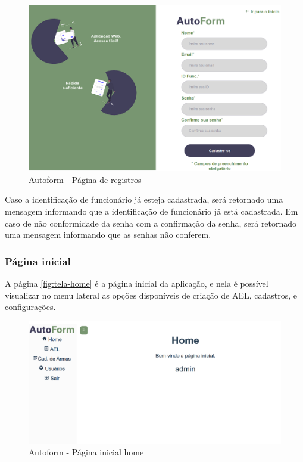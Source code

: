 \begin{figure}[htb]
    \caption{\label{fig:tela-registro}Autoform - Página de registros}
    \begin{center}
        \includegraphics[scale=0.6]{imagens/registro-autoform.png}   
     \end{center}
\end{figure}
Caso a identificação de funcionário já esteja cadastrada, será retornado uma mensagem informando que a identificação de funcionário já está cadastrada.
Em caso de não conformidade da senha com a confirmação da senha, será retornado uma mensagem informando que as senhas não conferem.

\subsubsection{Página inicial}
A página \autoref{fig:tela-home} é a página inicial da aplicação, e nela é possível visualizar no menu lateral as opções disponíveis de criação de AEL, cadastros, e configurações.

\begin{figure}[htb]
    \caption{\label{fig:tela-home}Autoform - Página inicial home}
    \begin{center}
        \includegraphics[scale=0.5]{imagens/home-autoform.png}
    \end{center}
\end{figure}

